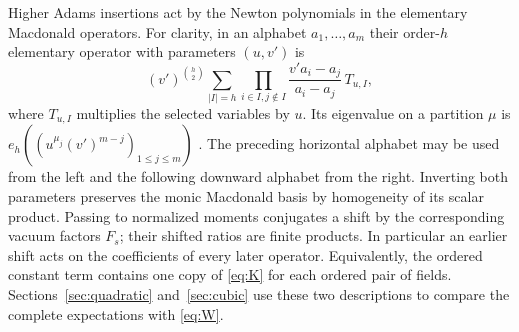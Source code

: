 Higher Adams insertions act by the Newton polynomials in the elementary Macdonald operators. For clarity, in an alphabet $a_1,\dots,a_m$ their order-$h$ elementary operator with parameters $(u,v')$ is
\[
 (v')^{\binom h2}
 \sum_{|I|=h}\prod_{i\in I,j\notin I}\frac{v'a_i-a_j}{a_i-a_j}\,T_{u,I},
\]
where $T_{u,I}$ multiplies the selected variables by $u$. Its eigenvalue on a partition $\mu$ is $e_h((u^{\mu_j}(v')^{m-j})_{1\le j\le m})$ \cite[\S2.2]{BC}. The preceding horizontal alphabet may be used from the left and the following downward alphabet from the right. Inverting both parameters preserves the monic Macdonald basis by homogeneity of its scalar product. Passing to normalized moments conjugates a shift by the corresponding vacuum factors $F_s$; their shifted ratios are finite products. In particular an earlier shift acts on the coefficients of every later operator. Equivalently, the ordered constant term contains one copy of \eqref{eq:K} for each ordered pair of fields. Sections~\ref{sec:quadratic} and~\ref{sec:cubic} use these two descriptions to compare the complete expectations with \eqref{eq:W}.
